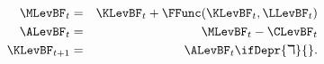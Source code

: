 \begin{eqnarray*}
    \MLevBF_{t}  & = & \KLevBF_{t}+\FFunc(\KLevBF_{t},\LLevBF_{t}) \label{eq:TransitionDSGE}
\\    \ALevBF_{t}  & = & \MLevBF_{t}-\CLevBF_{t}
\\    \KLevBF_{t+1} & = & \ALevBF_{t}  \ifDepr{\daleth}{}.
\end{eqnarray*}
